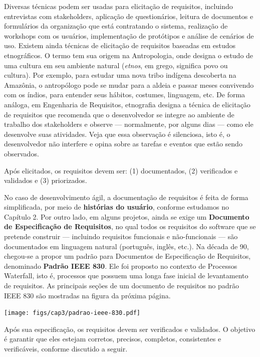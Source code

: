 \documentclass[
  11pt,
  twoside]{book}
\let\origfigure\figure
\let\endorigfigure\endfigure
\renewenvironment{figure}[1][2] {
    \expandafter\origfigure\expandafter[!h]
} {
    \endorigfigure
}
\begin{document}
Diversas técnicas podem ser usadas para elicitação de requisitos,
incluindo entrevistas com stakeholders, aplicação de questionários,
leitura de documentos e formulários da organização que está contratando
o sistema, realização de workshops com os usuários, implementação de
protótipos e análise de cenários de uso. Existem ainda técnicas de
elicitação de requisitos baseadas em estudos etnográficos. O termo tem
sua origem na Antropologia, onde designa o estudo de uma cultura em seu
ambiente natural (\emph{etnos}, em grego, significa povo ou cultura).
Por exemplo, para estudar uma nova tribo indígena descoberta na
Amazônia, o antropólogo pode se mudar para a aldeia e passar meses
convivendo com os índios, para entender seus hábitos, costumes,
linguagem, etc. De forma análoga, em Engenharia de Requisitos,
etnografia designa a técnica de elicitação de requisitos que recomenda
que o desenvolvedor se integre ao ambiente de trabalho dos stakeholders
e observe --- normalmente, por alguns dias --- como ele desenvolve suas
atividades. Veja que essa observação é silenciosa, isto é, o
desenvolvedor não interfere e opina sobre as tarefas e eventos que estão
sendo observados.

Após elicitados, os requisitos devem ser: (1) documentados, (2)
verificados e validados e (3) priorizados.

 No caso de desenvolvimento
ágil, a documentação de requisitos é feita de forma simplificada, por
meio de \textbf{histórias do usuário}, conforme estudamos no Capítulo 2.
Por outro lado, em alguns projetos, ainda se exige um \textbf{Documento
de Especificação de Requisitos}, no qual todos os requisitos do software
que se pretende construir --- incluindo requisitos funcionais e
não-funcionais --- são documentados em linguagem natural (português,
inglês, etc.). Na década de 90, chegou-se a propor um padrão para
Documentos de Especificação de Requisitos, denominado \textbf{Padrão
IEEE 830}. Ele foi proposto no contexto de Processos Waterfall, isto é,
processos que possuem uma longa fase inicial de levantamento de
requisitos. As principais seções de um documento de requisitos no padrão
IEEE 830 são mostradas na figura da próxima página.

\begin{figure}
\centering
\texttt{[image: figs/cap3/padrao-ieee-830.pdf]}
\caption{Documento de Requisitos no Padrão IEEE 830}
\end{figure}

 Após sua especificação, os requisitos
devem ser verificados e validados. O objetivo é garantir que eles
estejam corretos, precisos, completos, consistentes e verificáveis,
conforme discutido a seguir.
\end{document}

